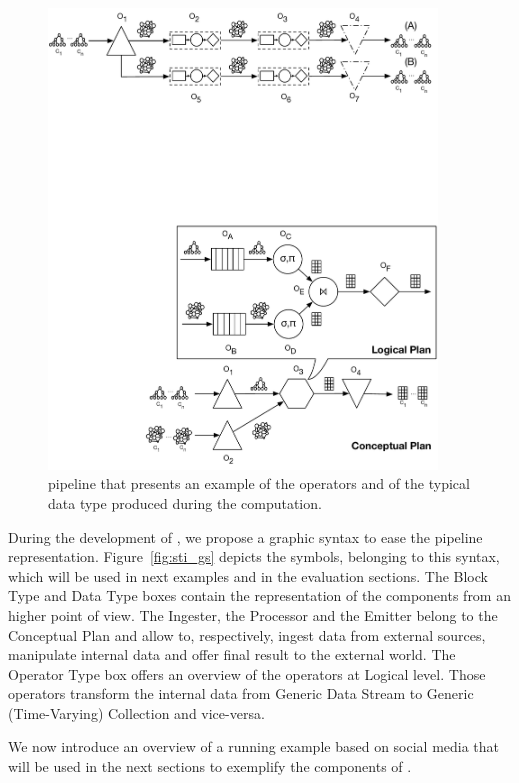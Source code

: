 {\begin{figure}[t]
\centering
\includegraphics[width=0.92\textwidth]{img/computational-model-syntax-example}
\caption{\sti{} pipeline that presents an example of the operators and of the typical data type produced during the computation.}
\label{fig:sti_ex}
\end{figure} 

During the development of \river{}, we propose a graphic syntax to ease the pipeline representation.
Figure~\ref{fig:sti_gs} depicts the symbols, belonging to this syntax, which will be used in next examples and in the evaluation sections.
The Block Type and Data Type boxes contain the representation of the components from an higher point of view. The \textsf{Ingester}, the \textsf{Processor} and the \textsf{Emitter} belong to the Conceptual Plan and allow to, respectively, ingest data from external sources, manipulate internal data and offer final result to the external world.
The Operator Type box offers an overview of the operators at Logical level. Those operators transform the internal data from Generic Data Stream to Generic (Time-Varying) Collection and vice-versa.

We now introduce an overview of a running example based on social media that will be used in the next sections to exemplify the components of \river{}.

}
